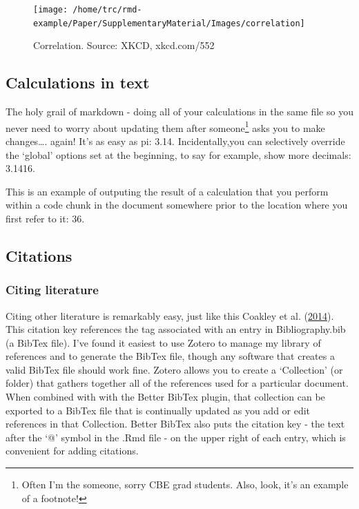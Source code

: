 \documentclass[]{elsarticle} %
\begin{document}
\begin{figure}[h]
\texttt{[image: /home/trc/rmd-example/Paper/SupplementaryMaterial/Images/correlation]} \caption{Correlation. Source: XKCD, xkcd.com/552}\label{fig:correlation}
\end{figure}

\hypertarget{calculations-in-text}{%
\subsection{Calculations in text}\label{calculations-in-text}}

The holy grail of markdown - doing all of your calculations in the same file so you never need to worry about updating them after someone\footnote{Often I'm the someone, sorry CBE grad students. Also, look, it's an example of a footnote!} asks you to make changes\ldots{}. again! It's as easy as pi: 3.14. Incidentally,you can selectively override the `global' options set at the beginning, to say for example, show more decimals: 3.1416.

This is an example of outputing the result of a calculation that you perform within a code chunk in the document somewhere prior to the location where you first refer to it: 36.

\hypertarget{citations}{%
\subsection{Citations}\label{citations}}

\hypertarget{citing-literature}{%
\subsubsection{Citing literature}\label{citing-literature}}

Citing other literature is remarkably easy, just like this Coakley et al. (\protect\hyperlink{ref-coakleyReviewMethodsMatch2014}{2014}). This citation key references the tag associated with an entry in Bibliography.bib (a BibTex file). I've found it easiest to use Zotero to manage my library of references and to generate the BibTex file, though any software that creates a valid BibTex file should work fine. Zotero allows you to create a `Collection' (or folder) that gathers together all of the references used for a particular document. When combined with with the Better BibTex plugin, that collection can be exported to a BibTex file that is continually updated as you add or edit references in that Collection. Better BibTex also puts the citation key - the text after the `@' symbol in the .Rmd file - on the upper right of each entry, which is convenient for adding citations.
\end{document}
